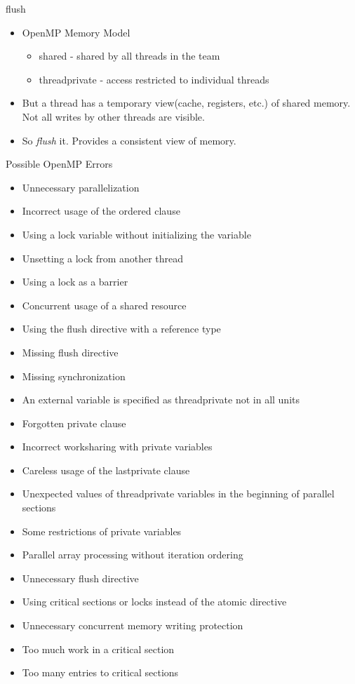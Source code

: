 \documentclass[10pt]{beamer}
\begin{document}
\begin{frame}{flush}
\begin{itemize}
\item OpenMP Memory Model
  \begin{itemize}
  \item shared - shared by all threads in the team
  \item threadprivate - access restricted to individual threads
  \end{itemize}
\item But a thread has a temporary view(cache, registers, etc.) of shared
  memory. Not all writes by other threads are visible.
\item So \emph{flush} it. Provides a consistent view of memory.
\end{itemize}
\end{frame}

\begin{frame}[shrink]{Possible OpenMP Errors}
\begin{itemize}
\item Unnecessary parallelization
\item Incorrect usage of the ordered clause
\item Using a lock variable without initializing the variable
\item Unsetting a lock from another thread
\item Using a lock as a barrier
\item Concurrent usage of a shared resource
\item Using the flush directive with a reference type
\item Missing flush directive
\item Missing synchronization
\item An external variable is specified as threadprivate not in all units
\item Forgotten private clause
\item Incorrect worksharing with private variables
\item Careless usage of the lastprivate clause
\item Unexpected values of threadprivate variables in the beginning of parallel sections
\item Some restrictions of private variables
\item Parallel array processing without iteration ordering
\item Unnecessary flush directive
\item Using critical sections or locks instead of the atomic directive
\item Unnecessary concurrent memory writing protection
\item Too much work in a critical section
\item Too many entries to critical sections
\end{itemize}
\end{frame}
\end{document}
